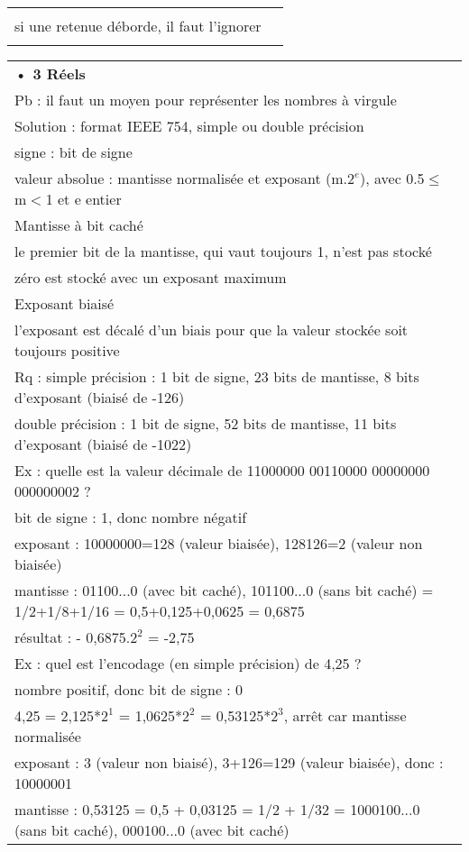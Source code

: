 \documentclass[5pt]{article}
\begin{document}
\begin{scriptsize}
\begin{tabular}{|c|c|}
\begin{tabularx}{0.5\linewidth}{|Y|}
faire une addition en base 2 \\
si une retenue déborde, il faut l'ignorer
\\ \hline
\end{tabularx} 
\\ \hline
\end{tabular}
\begin{tabularx}{0.5\linewidth}{|Y|}
\hline
\textbf{• 3 Réels}
\\
Pb : il faut un moyen pour représenter les nombres à virgule \\
Solution : format IEEE 754, simple ou double précision \\
signe : bit de signe \\
valeur absolue : mantisse normalisée et exposant (m.$2^{e}$), avec 0.5$\leq$m$<$1 et e entier \\
Mantisse à bit caché \\
le premier bit de la mantisse, qui vaut toujours 1, n'est pas stocké \\
zéro est stocké avec un exposant maximum
\\
Exposant biaisé \\
l'exposant est décalé d'un biais pour que la valeur stockée soit toujours positive \\
Rq : simple précision : 1 bit de signe, 23 bits de mantisse, 8 bits d'exposant (biaisé de -126) \\
double précision : 1 bit de signe, 52 bits de mantisse, 11 bits d'exposant (biaisé de -1022)
\\\hline
Ex : quelle est la valeur décimale de 11000000 00110000 00000000 000000002 ? \\
bit de signe : 1, donc nombre négatif \\
exposant : 10000000=128 (valeur biaisée), 128126=2 (valeur non biaisée) \\
mantisse : 01100...0 (avec bit caché), 101100...0 (sans bit caché) = 1/2+1/8+1/16 = 0,5+0,125+0,0625 = 0,6875\\
résultat : - 0,6875.$2^{2}$ = -2,75
\\\hline
Ex : quel est l'encodage (en simple précision) de 4,25 ? \\
nombre positif, donc bit de signe : 0 \\
4,25 = 2,125*$2^{1}$ = 1,0625*$2^{2}$ = 0,53125*$2^{3}$, arrêt car mantisse normalisée \\
exposant : 3 (valeur non biaisé), 3+126=129 (valeur biaisée), donc : 10000001 \\
mantisse : 0,53125 = 0,5 + 0,03125 = 1/2 + 1/32 = 1000100...0 (sans bit caché), 000100...0 (avec bit caché)\\

\end{tabularx}
\end{scriptsize}
\end{document}
